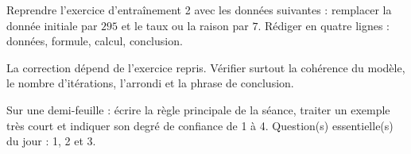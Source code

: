 
\begin{homework}Reprendre l'exercice d'entraînement 2 avec les données suivantes : remplacer la donnée initiale par $295$ et le taux ou la raison par $7$. Rédiger en quatre lignes : données, formule, calcul, conclusion.\end{homework}
\begin{solution}La correction dépend de l'exercice repris. Vérifier surtout la cohérence du modèle, le nombre d'itérations, l'arrondi et la phrase de conclusion.\end{solution}

\begin{exitticket}[3 minutes]Sur une demi-feuille : écrire la règle principale de la séance, traiter un exemple très court et indiquer son degré de confiance de 1 à 4. Question(s) essentielle(s) du jour : 1, 2 et 3.\end{exitticket}

